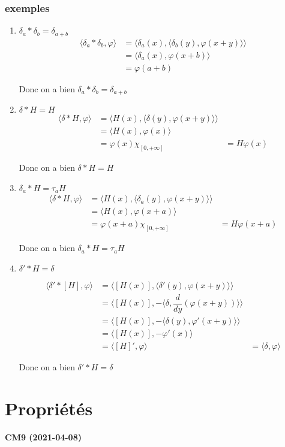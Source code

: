 \documentclass[12pt,a4paper]{report}
\begin{document}
\subsubsection{exemples}
\begin{enumerate}
	\item \(\delta_a * \delta_b = \delta_{a+b}\)
	\begin{align*}
		\langle \delta_a * \delta_b, \varphi \rangle &= \langle \delta_a(x), \langle \delta_b (y), \varphi(x+y)\rangle\rangle\\
		&= \langle \delta_a(x), \varphi(x + b) \rangle\\
		&= \varphi(a+b)
	\end{align*}
	
	Donc on a bien \(\delta_a * \delta_b = \delta_{a+b}\)
	
	\item \(\delta * H = H\)
	\begin{align*}
		\langle \delta * H, \varphi \rangle &= \langle H(x), \langle \delta (y), \varphi(x+y)\rangle\rangle\\
		&= \langle H(x), \varphi (x) \rangle\\
		&= \varphi(x) \chi_{[0, + \infty]}
		&= H\varphi(x)
	\end{align*}
	
	Donc on a bien \(\delta * H = H\)
	
	\item \(\delta_a * H = \tau_a H\)
	\begin{align*}
		\langle \delta * H, \varphi \rangle &= \langle H(x), \langle \delta_a (y), \varphi(x+y)\rangle\rangle\\
		&= \langle H(x), \varphi (x+a) \rangle\\
		&= \varphi(x+a) \chi_{[0, + \infty]}
		&= H\varphi(x+a)
	\end{align*}
	
	Donc on a bien \(\delta_a * H = \tau_a H\)
	
	\item \(\delta' * H = \delta\)
	
	\begin{align*}
		\langle \delta' * [H], \varphi \rangle &= \langle [H(x)], \langle \delta'(y), \varphi(x+y) \rangle \rangle\\
		&= \langle [ H(x)], - \langle \delta, \dfrac{d}{dy} (\varphi(x+y)) \rangle \rangle\\
		&= \langle [H(x)], - \langle \delta(y), \varphi'(x+y)\rangle \rangle\\
		&= \langle [H(x)], - \varphi'(x) \rangle\\
		&= \langle [H]', \varphi \rangle
		&= \langle \delta, \varphi \rangle
	\end{align*}
	
	Donc on a bien \(\delta' * H = \delta\)
	
\end{enumerate}

\section{Propriétés}

\begin{center}
\textbf{CM9 (2021-04-08)}
\end{center}
\end{document}
